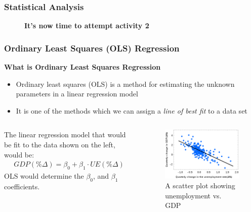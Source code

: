 \documentclass{beamer}
\begin{document}
\begin{frame}
\frametitle{Statistical Analysis}
\begin{figure}
\large\textbf{It's now time to attempt activity 2}
\end{figure}
\end{frame}


\begin{frame}
\frametitle{Ordinary Least Squares (OLS) Regression}
\textbf{What is Ordinary Least Squares Regression}\\
\vspace{0.3cm}
\begin{itemize}
\item Ordinary least squares (OLS) is a method for estimating the unknown parameters in a linear regression model
\vspace{0.3cm}
\item It is one of the methods which we can assign a \textit{line of best fit} to a data set
\end{itemize}
\begin{columns}
The linear regression model that would be fit to the data shown on the left, would be:
\begin{align*}
GDP(\% \Delta) = \beta_0 + \beta_1 \cdot UE(\% \Delta)
\end{align*}
OLS would determine the $\beta_0$, and $\beta_1$ coefficients.
\begin{figure}
\includegraphics[scale=0.4]{regression}
\caption{A scatter plot showing unemployment vs. GDP}
\end{figure}
\end{columns}
\end{frame}

\end{document}
